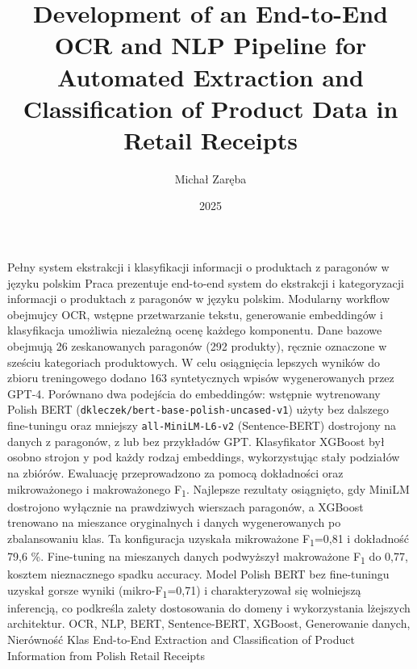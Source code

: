\documentclass{SGGW-thesis-EN}
\title{Development of an End-to-End OCR and NLP Pipeline for Automated Extraction and Classification of Product Data in Retail Receipts}
\author{Michał Zaręba}
\date{2025}
\begin{document}
\maketitle
\statementpage
\abstractpage
{Pełny system ekstrakcji i klasyfikacji informacji o produktach z paragonów w języku polskim}
{Praca prezentuje end-to-end system do ekstrakcji i kategoryzacji informacji o produktach z paragonów w języku polskim. 
Modularny workflow obejmujcy OCR, wstępne przetwarzanie tekstu, generowanie embeddingów i klasyfikacja umożliwia niezależną ocenę każdego komponentu. 
Dane bazowe obejmują 26 zeskanowanych paragonów (292 produkty), ręcznie oznaczone w sześciu kategoriach produktowych. 
W celu osiągnięcia lepszych wyników do zbioru treningowego dodano 163 syntetycznych wpisów wygenerowanych przez GPT-4.
Porównano dwa podejścia do embeddingów: wstępnie wytrenowany Polish BERT (\texttt{dkleczek/bert-base-polish-uncased-v1}) użyty bez dalszego fine-tuningu 
oraz mniejszy \texttt{all-MiniLM-L6-v2} (Sentence-BERT) dostrojony na danych z paragonów, z lub bez przykładów GPT.
Klasyfikator XGBoost był osobno strojon y pod każdy rodzaj embeddings, wykorzystując stały podziałów na zbiórów. 
Ewaluację przeprowadzono za pomocą dokładności oraz mikroważonego i makroważonego F\textsubscript{1}.
Najlepsze rezultaty osiągnięto, gdy MiniLM dostrojono wyłącznie na prawdziwych wierszach paragonów, 
a XGBoost trenowano na mieszance oryginalnych i danych wygenerowanych po zbalansowaniu klas. Ta konfiguracja uzyskała mikroważone F\textsubscript{1}=0,81 i dokładność 79,6 \%. 
Fine-tuning na mieszanych danych podwyższył makroważone F\textsubscript{1} do 0,77, kosztem nieznacznego spadku accuracy.
Model Polish BERT bez fine-tuningu uzyskał gorsze wyniki (mikro-F\textsubscript{1}=0,71) i charakteryzował się wolniejszą inferencją, 
co podkreśla zalety dostosowania do domeny i wykorzystania lżejszych architektur.}
{OCR, NLP, BERT, Sentence-BERT, XGBoost, Generowanie danych, Nierówność Klas}
{End-to-End Extraction and Classification of Product Information from Polish Retail Receipts}
\end{document}
